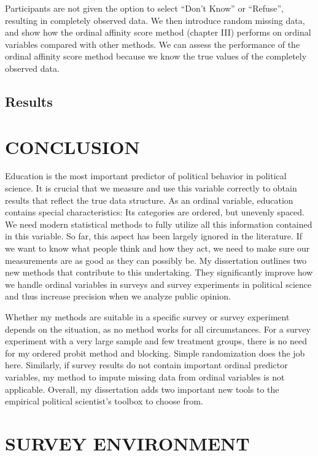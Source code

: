 \documentclass[12pt,econ]{sources/authesis}
\begin{document}
Participants are not given the option to select ``Don't Know'' or ``Refuse'', resulting in completely observed data. We then introduce random missing data, and show how the ordinal affinity score method (chapter III) performs on ordinal variables compared with other methods. We can assess the performance of the ordinal affinity score method because we know the true values of the completely observed data.

\hypertarget{framing-results}{%
\section{Results}\label{framing-results}}

\hypertarget{conclusion}{%
\chapter{CONCLUSION}\label{conclusion}}

Education is the most important predictor of political behavior in political science. It is crucial that we measure and use this variable correctly to obtain results that reflect the true data structure. As an ordinal variable, education contains special characteristics: Its categories are ordered, but unevenly spaced. We need modern statistical methods to fully utilize all this information contained in this variable. So far, this aspect has been largely ignored in the literature. If we want to know what people think and how they act, we need to make sure our measurements are as good as they can possibly be. My dissertation outlines two new methods that contribute to this undertaking. They significantly improve how we handle ordinal variables in surveys and survey experiments in political science and thus increase precision when we analyze public opinion.

Whether my methods are suitable in a specific survey or survey experiment depends on the situation, as no method works for all circumstances. For a survey experiment with a very large sample and few treatment groups, there is no need for my ordered probit method and blocking. Simple randomization does the job here. Similarly, if survey results do not contain important ordinal predictor variables, my method to impute missing data from ordinal variables is not applicable. Overall, my dissertation adds two important new tools to the empirical political scientist's toolbox to choose from.

\appendix

\hypertarget{app-survey}{%
\chapter{SURVEY ENVIRONMENT}\label{app-survey}}
\end{document}
